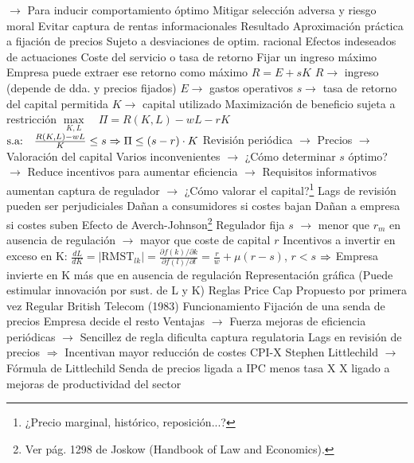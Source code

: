 \documentclass{nuevotema}
\begin{document}
\begin{esquemal}
				\4[] $\to$ Para inducir comportamiento óptimo
				\4[] Mitigar selección adversa y riesgo moral
				\4[] Evitar captura de rentas informacionales
				\4 Resultado
				\4[] Aproximación práctica a fijación de precios
				\4[] Sujeto a desviaciones de optim. racional
				\4[] Efectos indeseados de actuaciones
			\3 Coste del servicio o tasa de retorno
				\4 Fijar un ingreso máximo
				\4[] Empresa puede extraer ese retorno como máximo
				\4 $R = E + sK$
				\4[] $R \to$ ingreso (depende de dda. y precios fijados)
				\4[] $E \to$ gastos operativos
				\4[] $s \to$ tasa de retorno del capital permitida
				\4[] $K \to$ capital utilizado
				\4 Maximización de beneficio sujeta a restricción
				\4[] $\underset{K,L}{\max} \quad \Pi = R(K,L) - wL - rK$
				\4[] $\text{s.a:} \quad \frac{R(K,L) - wL}{K} \leq s \Rightarrow \Pi \leq (s-r) \cdot K$
				\4 Revisión periódica
				\4[] $\to$ Precios
				\4[] $\to$ Valoración del capital
				\4 Varios inconvenientes
				\4[] $\to$ ¿Cómo determinar $s$ óptimo?
				\4[] $\to$ Reduce incentivos para aumentar eficiencia
				\4[] $\to$ Requisitos informativos aumentan captura de regulador
				\4[] $\to$ ¿Cómo valorar el capital?\footnote{¿Precio marginal, histórico, reposición...?}
				\4[$\to$] Lags de revisión pueden ser perjudiciales
				\4[] Dañan a consumidores si costes bajan
				\4[] Dañan a empresa si costes suben
				\4[$\to$] Efecto de Averch-Johnson\footnote{Ver pág. 1298 de Joskow (Handbook of Law and Economics).}
				\4[] Regulador fija $s$
				\4[] $\to$ menor que $r_m$ en ausencia de regulación
				\4[] $\to$ mayor que coste de capital $r$
				\4[] Incentivos a invertir en exceso en K: 
				\4[] $\frac{d L}{d K} = \left| \text{RMST}_{lk} \right| = \frac{ \partial f(k) / \partial k}{\partial f(l) / \partial l} = \frac{r}{w} + \mu(r-s)$, $r < s$
				\4[] $\Rightarrow$ Empresa invierte en K más que en ausencia de regulación
				\4[] Representación gráfica
				\4[] 
				\4[] (Puede estimular innovación por sust. de L y K)
			\3 Reglas Price Cap
				\4 Propuesto por primera vez
				\4[] Regular British Telecom (1983)
				\4 Funcionamiento
				\4[] Fijación de una senda de precios
				\4[] Empresa decide el resto
				\4 Ventajas
				\4[] $\to$ Fuerza mejoras de eficiencia periódicas
				\4[] $\to$ Sencillez de regla dificulta captura regulatoria
				\4 Lags en revisión de precios
				\4[] $\Rightarrow$ Incentivan mayor reducción de costes
				\4 CPI-X
				\4[] Stephen Littlechild $\to$ Fórmula de Littlechild
				\4[] Senda de precios ligada a IPC menos tasa X
				\4[] X ligado a mejoras de productividad del sector

\end{esquemal}
\end{document}
